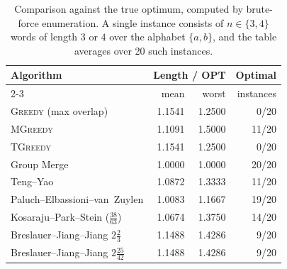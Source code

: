 \begin{table}[htbp]
    \centering
    \caption{Comparison against the true optimum, computed by brute-force enumeration. A single instance consists of $n \in \{3,4\}$ words of length $3$ or $4$ over the alphabet $\{a,b\}$, and the table averages over 20 such instances.}
    \label{tab:bench_exact_small}
    \small
    \setlength{\tabcolsep}{7pt}
    \renewcommand{\arraystretch}{1.1}
    \begin{tabular}{@{}lrrr@{}}
        \toprule
        \textbf{Algorithm} & \multicolumn{2}{c}{\textbf{Length / OPT}} & \textbf{Optimal} \\
        \cmidrule(lr){2-3}
         & mean & worst & instances \\
        \midrule
        \textsc{Greedy} (max overlap) & 1.1541 & 1.2500 & 0/20 \\
        \textsc{MGreedy} & 1.1091 & 1.5000 & 11/20 \\
        \textsc{TGreedy} & 1.1541 & 1.2500 & 0/20 \\
        Group Merge & 1.0000 & 1.0000 & 20/20 \\
        Teng--Yao & 1.0872 & 1.3333 & 11/20 \\
        Paluch--Elbassioni--van~Zuylen & 1.0083 & 1.1667 & 19/20 \\
        Kosaraju--Park--Stein ($\frac{38}{63}$) & 1.0674 & 1.3750 & 14/20 \\
        Breslauer--Jiang--Jiang $2\frac{2}{3}$ & 1.1488 & 1.4286 & 9/20 \\
        Breslauer--Jiang--Jiang $2\frac{25}{42}$ & 1.1488 & 1.4286 & 9/20 \\
        \bottomrule
    \end{tabular}
\end{table}

